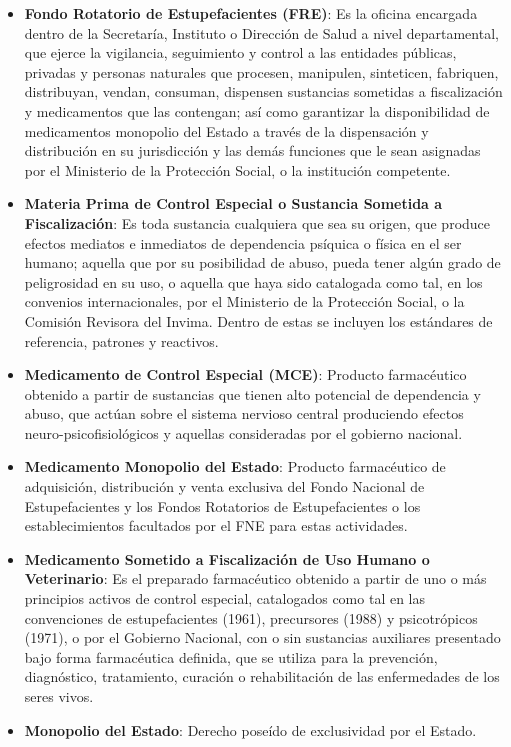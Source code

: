 \documentclass[
]{book}
\begin{document}
\begin{itemize}
\item
  \textbf{Fondo Rotatorio de Estupefacientes (FRE)}: Es la oficina encargada dentro de la Secretaría, Instituto o Dirección de Salud a nivel departamental, que ejerce la vigilancia, seguimiento y control a las entidades públicas, privadas y personas naturales que procesen, manipulen, sinteticen, fabriquen, distribuyan, vendan, consuman, dispensen sustancias sometidas a fiscalización y medicamentos que las contengan; así como garantizar la disponibilidad de medicamentos monopolio del Estado a través de la dispensación y distribución en su jurisdicción y las demás funciones que le sean asignadas por el Ministerio de la Protección Social, o la institución competente.
\item
  \textbf{Materia Prima de Control Especial o Sustancia Sometida a Fiscalización}: Es toda sustancia cualquiera que sea su origen, que produce efectos mediatos e inmediatos de dependencia psíquica o física en el ser humano; aquella que por su posibilidad de abuso, pueda tener algún grado de peligrosidad en su uso, o aquella que haya sido catalogada como tal, en los convenios internacionales, por el Ministerio de la Protección Social, o la Comisión Revisora del Invima. Dentro de estas se incluyen los estándares de referencia, patrones y reactivos.
\item
  \textbf{Medicamento de Control Especial (MCE)}: Producto farmacéutico obtenido a partir de sustancias que tienen alto potencial de dependencia y abuso, que actúan sobre el sistema nervioso central produciendo efectos neuro-psicofisiológicos y aquellas consideradas por el gobierno nacional.
\item
  \textbf{Medicamento Monopolio del Estado}: Producto farmacéutico de adquisición, distribución y venta exclusiva del Fondo Nacional de Estupefacientes y los Fondos Rotatorios de Estupefacientes o los establecimientos facultados por el FNE para estas actividades.
\item
  \textbf{Medicamento Sometido a Fiscalización de Uso Humano o Veterinario}: Es el preparado farmacéutico obtenido a partir de uno o más principios activos de control especial, catalogados como tal en las convenciones de estupefacientes (1961), precursores (1988) y psicotrópicos (1971), o por el Gobierno Nacional, con o sin sustancias auxiliares presentado bajo forma farmacéutica definida, que se utiliza para la prevención, diagnóstico, tratamiento, curación o rehabilitación de las enfermedades de los seres vivos.
\item
  \textbf{Monopolio del Estado}: Derecho poseído de exclusividad por el Estado.

\end{itemize}
\end{document}
